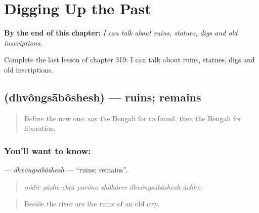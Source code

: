 
\chapter{Digging Up the Past}
\label{ch:bn-digging-up-the-past}

\begin{chapteropening}
\textbf{By the end of this chapter:} \emph{I can talk about ruins, statues, digs and old inscriptions.}

Complete the last lesson of chapter 319: I can talk about ruins, statues, digs and old inscriptions.
\end{chapteropening}

\section[\texorpdfstring{\bn{ধ্বংসাবশেষ} (dhvôngsābôshesh)}{ধ্বংসাবশেষ (dhvôngsābôshesh)}]{ (dhvôngsābôshesh) — ruins; remains}

\label{lesson:BN-C319-dhvongsaboshesh}



\begin{quote}
Before the new one: say the Bengali for to found, then the Bengali for liberation.
\end{quote}

\subsection*{You'll want to know: }
\textbf{} — \emph{dhvôngsābôshesh} — \textquotedblleft{}ruins; remains\textquotedblright{}.

\begin{quote}
      
\end{quote}

\begin{quote}
\emph{nôdīr pāshe ekṭā purôno shôhôrer dhvôngsābôshesh āchhe.}
\end{quote}

\begin{quote}
Beside the river are the ruins of an old city.
\end{quote}

